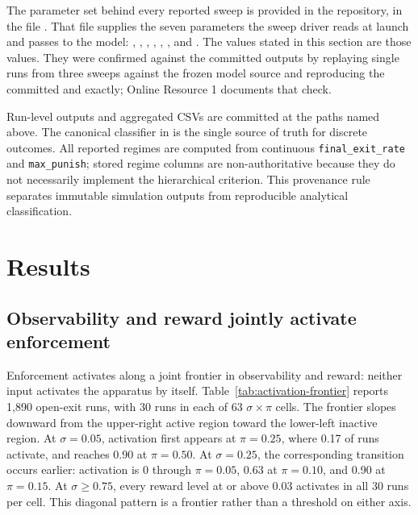 \documentclass[12pt]{article}
\begin{document}
The parameter set behind every reported sweep is provided in the repository, in
the file . That file supplies the seven
parameters the sweep driver 
reads at launch and passes to the model: ,
, ,
, ,
, and . The values
stated in this section are those values. They were confirmed against the
committed outputs by replaying single runs from three sweeps against the frozen
model source and reproducing the committed  and
 exactly; Online Resource 1 documents that check.

Run-level outputs and aggregated CSVs are committed at the paths named above.
The canonical classifier in  is the single source
of truth for discrete outcomes. All reported regimes are computed from continuous
\texttt{final\_exit\_rate} and \texttt{max\_punish}; stored regime columns are
non-authoritative because they do not necessarily implement the hierarchical
criterion. This provenance rule separates immutable simulation outputs from
reproducible analytical classification.


\section{Results}

\subsection{Observability and reward jointly activate enforcement}

Enforcement activates along a joint frontier in observability and reward: neither input
activates the apparatus by itself. Table~\ref{tab:activation-frontier} reports 1,890 open-exit
runs, with 30 runs in each of 63 \(\sigma \times \pi\) cells. The frontier slopes downward from
the upper-right active region toward the lower-left inactive region. At \(\sigma=0.05\),
activation first appears at \(\pi=0.25\), where 0.17 of runs activate, and reaches 0.90 at
\(\pi=0.50\). At \(\sigma=0.25\), the corresponding transition occurs earlier: activation is 0
through \(\pi=0.05\), 0.63 at \(\pi=0.10\), and 0.90 at \(\pi=0.15\). At \(\sigma \geq 0.75\),
every reward level at or above 0.03 activates in all 30 runs per cell. This diagonal pattern is
a frontier rather than a threshold on either axis.
\end{document}

